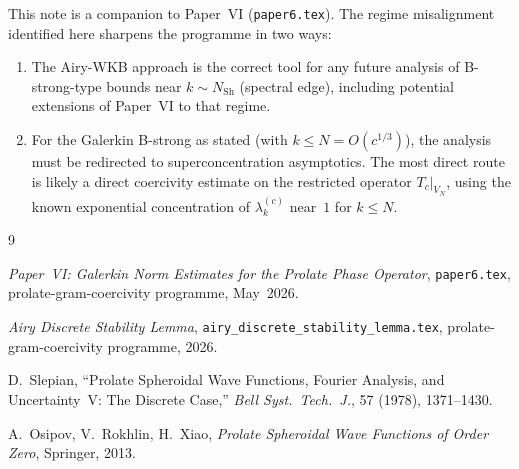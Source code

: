 \documentclass[12pt,a4paper]{article}
\newcommand{\lam}[1]{\lambda_{#1}^{(c)}}
\begin{document}
This note is a companion to Paper~VI (\texttt{paper6.tex}).
The regime misalignment identified here sharpens the
programme in two ways:
\begin{enumerate}[nosep]
  \item The Airy-WKB approach is the correct tool for any
        future analysis of B-strong-type bounds near
        $k \sim N_{\mathrm{Sh}}$ (spectral edge), including
        potential extensions of Paper~VI to that regime.
  \item For the Galerkin B-strong as stated (with $k \leq N
        = O(c^{1/3})$), the analysis must be redirected to
        superconcentration asymptotics.
        The most direct route is likely a
        direct coercivity estimate on the restricted
        operator $T_c|_{V_N}$, using the known
        exponential concentration of $\lam{k}$ near~$1$
        for $k \leq N$.
\end{enumerate}

\begin{thebibliography}{9}

  \textit{Paper~VI: Galerkin Norm Estimates for the Prolate Phase Operator},
  \texttt{paper6.tex}, prolate-gram-coercivity programme, May~2026.

  \textit{Airy Discrete Stability Lemma},
  \texttt{airy\_discrete\_stability\_lemma.tex},
  prolate-gram-coercivity programme, 2026.

  D.~Slepian,
  ``Prolate Spheroidal Wave Functions, Fourier Analysis, and
  Uncertainty~V: The Discrete Case,''
  \textit{Bell Syst.\ Tech.\ J.}, 57 (1978), 1371--1430.

  A.~Osipov, V.~Rokhlin, H.~Xiao,
  \textit{Prolate Spheroidal Wave Functions of Order Zero},
  Springer, 2013.

\end{thebibliography}
\end{document}
